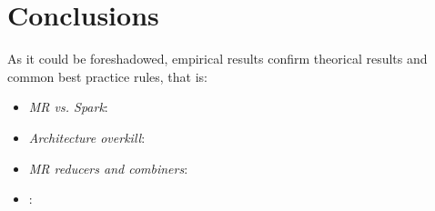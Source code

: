\chapter{Conclusions}

As it could be foreshadowed, empirical results confirm theorical results and common best practice rules, that is:
\begin{itemize}
  \item \textit{MR vs. Spark}:
  \item \textit{Architecture overkill}:
  \item \textit{MR reducers and combiners}:
  \item {}: 
\end{itemize}